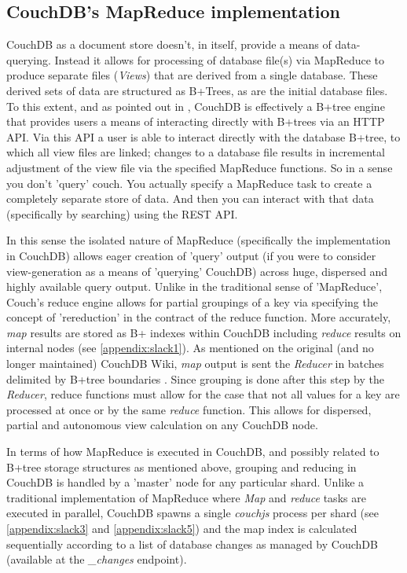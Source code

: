 \subsection{CouchDB's MapReduce implementation}
CouchDB as a document store doesn't, in itself, provide a means of data-querying. Instead it allows for processing of database file(s) via MapReduce to produce separate files (\textit{Views}) that are derived from a single database. These derived sets of data are structured as B+Trees, as are the initial database files. To this extent, and as pointed out in \cite{couchguide}, CouchDB is effectively a B+tree engine that provides users a means of interacting directly with B+trees via an HTTP API. Via this API a user is able to interact directly with the database B+tree, to which all view files are linked; changes to a database file results in incremental adjustment of the view file via the specified MapReduce functions. So in a sense you don’t 'query' couch. You actually specify a MapReduce task to create a completely separate store of data. And then you can interact with that data (specifically by searching) using the REST API.

In this sense the isolated nature of MapReduce (specifically the implementation in CouchDB) allows eager creation of 'query' output (if you were to consider view-generation as a means of 'querying' CouchDB) across huge, dispersed and highly available query output. Unlike in the traditional sense of 'MapReduce', Couch's reduce engine allows for partial groupings of a key via specifying the concept of 'rereduction' in the contract of the reduce function. More accurately, \textit{map} results are stored as B+ indexes within CouchDB including \textit{reduce} results on internal nodes (see \ref{appendix:slack1}). As mentioned on the original (and no longer maintained) CouchDB Wiki, \textit{map} output is sent the \textit{Reducer} in batches delimited by B+tree boundaries \cite{couchwiki}. Since grouping is done after this step by the \textit{Reducer}, reduce functions must allow for the case that not all values for a key are processed at once or by the same \textit{reduce} function. This allows for dispersed, partial and autonomous view calculation on any CouchDB node.

In terms of how MapReduce is executed in CouchDB, and possibly related to B+tree storage structures as mentioned above, grouping and reducing in CouchDB is handled by a 'master' node for any particular shard. Unlike a traditional implementation of MapReduce where \textit{Map} and \textit{reduce} tasks are executed in parallel, CouchDB spawns a single \textit{couchjs} process per shard (see \ref{appendix:slack3} and \ref{appendix:slack5}) and the map index is calculated sequentially according to a list of database changes as managed by CouchDB (available at the \textit{\_changes} endpoint).

